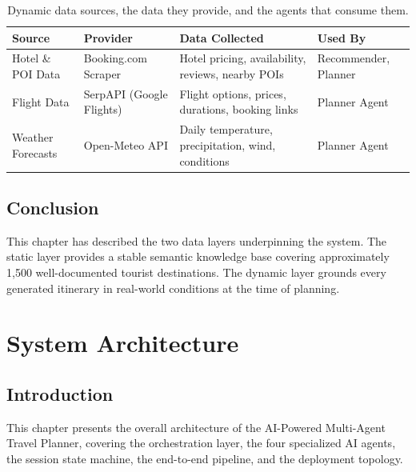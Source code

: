 \documentclass[12pt,a4paper]{report}
\begin{document}
\begin{table}[htbp]
\centering
\small
\renewcommand{\arraystretch}{1.3}
\begin{tabularx}{\textwidth}{
    >{\raggedright\arraybackslash}p{2.8cm}
    >{\raggedright\arraybackslash}p{3.0cm}
    >{\raggedright\arraybackslash}X
    >{\raggedright\arraybackslash}p{3.2cm}}
\toprule
\textbf{Source} & \textbf{Provider} & \textbf{Data Collected} & \textbf{Used By} \\
\midrule
Hotel \& POI Data
  & Booking.com Scraper
  & Hotel pricing, availability, reviews, nearby POIs
  & Recommender, Planner \\
Flight Data
  & SerpAPI (Google Flights)
  & Flight options, prices, durations, booking links
  & Planner Agent \\
Weather Forecasts
  & Open-Meteo API
  & Daily temperature, precipitation, wind, conditions
  & Planner Agent \\
\bottomrule
\end{tabularx}
\caption{Dynamic data sources, the data they provide, and the agents that consume them.}
\label{tab:dynamic-data}
\end{table}

\section*{Conclusion}

This chapter has described the two data layers underpinning the system. The static layer provides a
stable semantic knowledge base covering approximately 1,500 well-documented tourist destinations.
The dynamic layer grounds every generated itinerary in real-world conditions at the time of
planning.

\chapter{System Architecture}

\section*{Introduction}

This chapter presents the overall architecture of the AI-Powered Multi-Agent Travel Planner,
covering the orchestration layer, the four specialized AI agents, the session state machine, the
end-to-end pipeline, and the deployment topology.
\end{document}
